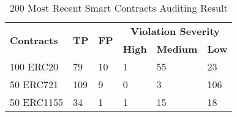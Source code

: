 

\begin{table}[h]

    \centering
    \begin{tabularx}{\columnwidth}{lXX|XXX}
    \hline
    \multirow{2}{*}{\textbf{Contracts}} & \multirow{2}{*}{\textbf{TP}} & \multirow{2}{*}{\textbf{FP}} & \multicolumn{3}{c}{\textbf{Violation Severity}} \\
    \cline{4-6}
    & & & \textbf{High} & \textbf{Medium} & \textbf{Low} \\
    \hline
    100 ERC20 & 79 & 10 & 1 & 55 & 23 \\
    \hline
    50 ERC721 & 109 & 9 & 0 & 3 & 106 \\
    \hline
    50 ERC1155 & 34 & 1 & 1 & 15 & 18 \\
    \hline

    \end{tabularx}
    \caption{200 Most Recent Smart Contracts Auditing Result}
    \label{tab:token_type_analysis}
\end{table}